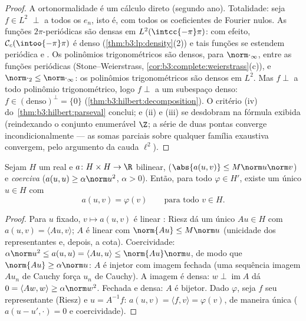 \begin{proof}
A ortonormalidade é um cálculo direto (segundo ano). Totalidade: seja
$f \in L^2$ $\perp$ a todos os $e_n$, isto é, com todos os
coeficientes de Fourier nulos. As funções 
$2\pi$-periódicas são densas em $L^2(\intcc{-\pi}\pi)$: com efeito, $\mathcal
C_c(\intoo{-\pi}\pi)$ é denso
(\cref{thm:b3:lp:density}(2)) e tais funções se estendem periódica e
. Os polinômios trigonométricos são densos, para $\norm\cdot_\infty$,
entre as funções  periódicas (Stone--Weierstrass,
\cref{cor:b3:complete:weierstrass}(c)), e $\norm\cdot_2 \leq \norm\cdot_\infty$: os polinômios trigonométricos são densos em
$L^2$. Mas $f \perp$ a todo polinômio trigonométrico, logo $f \perp$ a um
subespaço denso: $f
\in (\text{denso})^\perp = \{0\}$ (\cref{thm:b3:hilbert:decomposition}). O critério (iv)
do~\cref{thm:b3:hilbert:parseval} conclui; e (ii) e (iii) se desdobram na fórmula
exibida (reindexando o conjunto enumerável $\Z$; a série de duas
pontas converge incondicionalmente --- as somas parciais sobre qualquer
família exaustiva convergem, pelo argumento da cauda $\ell^2$).
\end{proof}

\begin{theorem}\label{thm:b3:hilbert:laxmilgram}
Sejam $H$ um  real e $a \colon H\times H \to
\R$ bilinear,
\emph{} ($\abs{a(u,v)} \leq M\norm
u\norm v$) e \emph{coerciva} ($a(u, u) \geq \alpha\norm u^2$, $\alpha > 0$). Então, para
todo $\varphi \in H'$, existe um único $u \in H$ com
\[
a(u, v) = \varphi(v) \qquad \text{para todo } v \in H .
\]
\end{theorem}

\begin{proof}
Para $u$ fixado, $v \mapsto a(u, v)$ é linear : Riesz dá um único $Au \in H$
com $a(u,v) = \langle Au,
v\rangle$; $A$ é linear com $\norm{Au} \leq M\norm u$ (unicidade dos representantes e,
depois, a cota). Coercividade: $\alpha\norm u^2 \leq a(u,u) = \langle Au, u\rangle \leq
\norm{Au}\norm u$, de modo que $\norm{Au} \geq \alpha\norm u$: $A$ é
injetor com imagem fechada (uma sequência imagem $Au_n$ de Cauchy
força $u_n$ de Cauchy). A imagem é densa: $w \perp
\operatorname{im}A$ dá $0 = \langle Aw, w\rangle \geq
\alpha\norm w^2$. Fechada e
densa: $A$ é bijetor. Dado $\varphi$, seja $f$ seu representante
(Riesz) e $u = A^{-1}f$: $a(u, v) = \langle f, v\rangle = \varphi(v)$, de maneira única ($a(u - u', \cdot) = 0$ e coercividade).
\end{proof}

